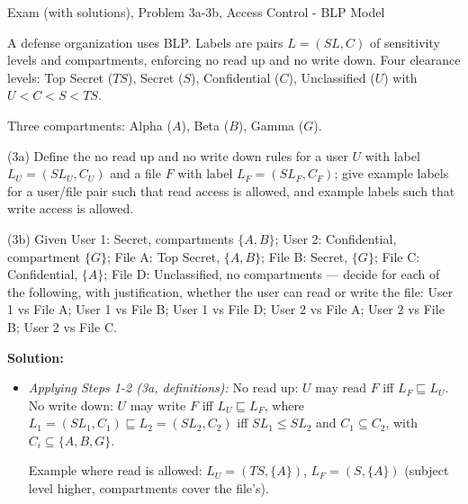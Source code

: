\documentclass[12pt, a4paper]{article}
\begin{document}
\begin{practicebox}{Exam (with solutions), Problem 3a-3b, Access Control - BLP Model}
\begin{problembox}
A defense organization uses BLP. Labels are pairs $L = (SL, C)$ of sensitivity levels and compartments, enforcing no read up and no write down. Four clearance levels: Top Secret ($TS$), Secret ($S$), Confidential ($C$), Unclassified ($U$) with $U < C < S < TS$.

Three compartments: Alpha ($A$), Beta ($B$), Gamma ($G$).

(3a) Define the no read up and no write down rules for a user $U$ with label $L_U = (SL_U, C_U)$ and a file $F$ with label $L_F = (SL_F, C_F)$; give example labels for a user/file pair such that read access is allowed, and example labels such that write access is allowed.

(3b) Given User 1: Secret, compartments $\{A, B\}$; User 2: Confidential, compartment $\{G\}$; File A: Top Secret, $\{A, B\}$; File B: Secret, $\{G\}$; File C: Confidential, $\{A\}$; File D: Unclassified, no compartments --- decide for each of the following, with justification, whether the user can read or write the file: User 1 vs File A; User 1 vs File B; User 1 vs File D; User 2 vs File A; User 2 vs File B; User 2 vs File C.
\end{problembox}

\textbf{Solution:}
\begin{itemize}
    \item \textit{Applying Steps 1-2 (3a, definitions):} No read up: $U$ may read $F$ iff $L_F \sqsubseteq L_U$. No write down: $U$ may write $F$ iff $L_U \sqsubseteq L_F$, where $L_1 = (SL_1, C_1) \sqsubseteq L_2 = (SL_2, C_2)$ iff $SL_1 \leq SL_2$ and $C_1 \subseteq C_2$, with $C_i \subseteq \{A, B, G\}$.

    Example where read is allowed: $L_U = (TS, \{A\})$, $L_F = (S, \{A\})$ (subject level higher, compartments cover the file's).


\end{itemize}
\end{practicebox}
\end{document}
